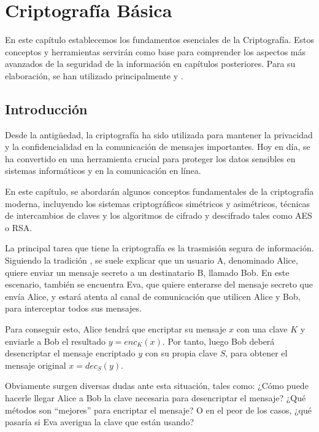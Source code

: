 \chapter{Criptografía Básica} \label{ch:primer-capitulo}

    En este capítulo establecemos los fundamentos esenciales de la Criptografía. Estos conceptos y herramientas servirán como base para comprender los aspectos más avanzados de la seguridad de la información en capítulos posteriores. Para su elaboración, se han utilizado principalmente \cite{cryptoSchool} y \cite{artDH}.
    
    \section{Introducción}
    
     Desde la antigüedad, la criptografía ha sido utilizada para mantener la privacidad y la confidencialidad en la comunicación de mensajes importantes. Hoy en día, se ha convertido en una herramienta crucial para proteger los datos sensibles en sistemas informáticos y en la comunicación en línea.

    En este capítulo, se abordarán algunos conceptos fundamentales de la criptografía moderna, incluyendo los sistemas criptográficos simétricos y asimétricos, técnicas de intercambios de claves y los algoritmos de cifrado y descifrado tales como AES o RSA.

    La principal tarea que tiene la criptografía es la trasmisión segura de información. Siguiendo la tradición \cite{cryptoSchool}, se suele explicar que un usuario A, denominado Alice, quiere enviar un mensaje secreto a un destinatario B, llamado Bob. En este escenario, también se encuentra Eva, que quiere enterarse del mensaje secreto que envía Alice, y estará atenta al canal de comunicación que utilicen Alice y Bob, para interceptar todos sus mensajes.

    Para conseguir esto, Alice tendrá que encriptar su mensaje $x$ con una clave $K$ y enviarle a Bob el resultado $y = enc_{K}(x)$. Por tanto, luego Bob deberá desencriptar el mensaje encriptado $y$ con su propia clave $S$, para obtener el mensaje original $x = dec_{S}(y)$.

    Obviamente surgen diversas dudas ante esta situación, tales como: ¿Cómo puede hacerle llegar Alice a Bob la clave necesaria para desencriptar el mensaje? ¿Qué métodos son ``mejores'' para encriptar el mensaje? O en el peor de los casos, ¿qué pasaría si Eva averigua la clave que están usando?


